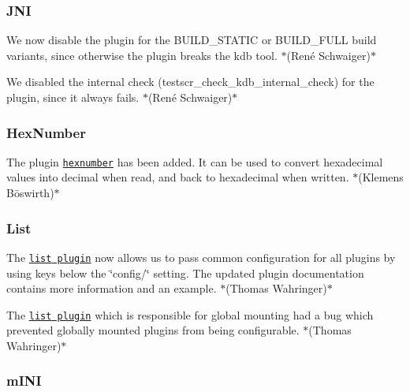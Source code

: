 \subsubsection*{J\+NI}


\begin{DoxyItemize}
\item We now disable the plugin for the {\ttfamily B\+U\+I\+L\+D\+\_\+\+S\+T\+A\+T\+IC} or {\ttfamily B\+U\+I\+L\+D\+\_\+\+F\+U\+LL} build variants, since otherwise the plugin breaks the {\ttfamily kdb} tool. $\ast$(René Schwaiger)$\ast$
\item We disabled the internal check ({\ttfamily testscr\+\_\+check\+\_\+kdb\+\_\+internal\+\_\+check}) for the plugin, since it always fails. $\ast$(René Schwaiger)$\ast$
\end{DoxyItemize}

\subsubsection*{Hex\+Number}


\begin{DoxyItemize}
\item The plugin \href{https://www.libelektra.org/plugins/hexnumber}{\tt hexnumber} has been added. It can be used to convert hexadecimal values into decimal when read, and back to hexadecimal when written. $\ast$(Klemens Böswirth)$\ast$
\end{DoxyItemize}

\subsubsection*{List}


\begin{DoxyItemize}
\item The \href{http://libelektra.org/plugins/list}{\tt {\ttfamily list} plugin} now allows us to pass common configuration for all plugins by using keys below the \char`\"{}config/\char`\"{} setting. The updated plugin documentation contains more information and an example. $\ast$(Thomas Wahringer)$\ast$
\item The \href{http://libelektra.org/plugins/list}{\tt {\ttfamily list} plugin} which is responsible for global mounting had a bug which prevented globally mounted plugins from being configurable. $\ast$(Thomas Wahringer)$\ast$
\end{DoxyItemize}

\subsubsection*{m\+I\+NI}


